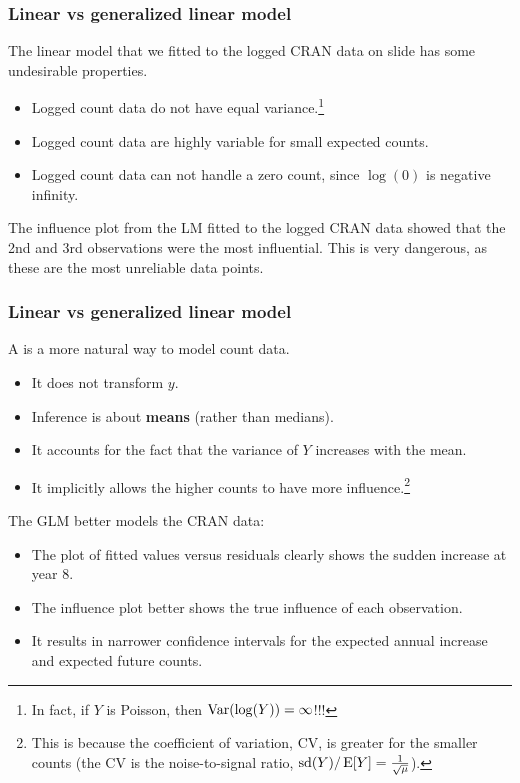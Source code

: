 \documentclass{beamer}\usepackage[]{graphicx}\usepackage[]{xcolor}
\begin{document}
\begin{frame}
\frametitle{Linear vs generalized linear model}
The linear model that we fitted to the logged CRAN data on slide \pageref{pg:CRAN LM} has some undesirable properties. 
\bigskip

\begin{itemize}
  \item Logged count data do not have equal variance.\footnote{In fact, if $Y$ is Poisson, then $\operatorname*{Var}(\log(Y))=\infty$!!!}
  \item Logged count data are highly variable for small expected counts.
  \item Logged count data can not handle a zero count, since $\log(0)$ is negative infinity.
\end{itemize}
\bigskip

The influence plot from the LM fitted to the logged CRAN data showed that the 2nd and 3rd observations were the most influential. This is very dangerous, as these are the most unreliable data points. 
 
\end{frame}


\begin{frame}
\frametitle{Linear vs generalized linear model}
A  is a more natural way to model count data. 
\begin{itemize}
  \item It does not transform $y$.
  \item Inference is about {\bf means} (rather than medians).
  \item It accounts for the fact that the variance of $Y$ increases with the mean.
  \item It implicitly allows the higher counts to have more influence.\footnote{This is because the coefficient of variation, CV, is greater for the smaller counts (the CV is the noise-to-signal ratio, $\operatorname{sd}(Y)/\operatorname{E}[Y]=\frac{1}{\sqrt{\mu}}$).}
\end{itemize}
\bigskip

The GLM better models the CRAN data:
\begin{itemize}
  \item The plot of fitted values versus residuals clearly shows the sudden increase at year 8.
  \item The influence plot better shows the true influence of each observation.
  \item It results in narrower confidence intervals for the expected annual increase and expected future counts.
\end{itemize}
\bigskip

\end{frame}
\end{document}
